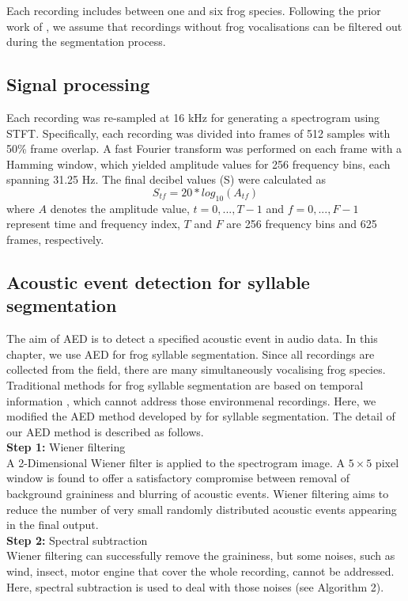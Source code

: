 Each recording includes between one and six frog species. Following the prior work of \citep{briggs2012acoustic}, we assume that recordings without frog vocalisations can be filtered out during the segmentation process.

\subsection{Signal processing}
Each recording was re-sampled at 16 kHz for generating a spectrogram using STFT. Specifically, each recording was divided into frames of 512 samples with 50\% frame overlap.
A fast Fourier transform was performed on each frame with a Hamming window, which yielded amplitude values for 256 frequency bins, each spanning 31.25 Hz. The final decibel values (S) were calculated as 
\begin{equation}
S_{tf} = 20*log_{10}(A_{tf})
\end{equation}
where $A$ denotes the amplitude value, $t=0,...,T-1$ and $f=0,...,F-1$ represent time and frequency index, $T$ and $F$ are 256 frequency bins and 625 frames, respectively. 

\subsection{Acoustic event detection for syllable segmentation}
\label{Ch5:AEDmethod}

The aim of AED is to detect a specified acoustic event in audio data. In this chapter, we use AED for frog syllable segmentation. Since all recordings are collected from the field, there are many simultaneously vocalising frog species. Traditional methods for frog syllable segmentation are based on temporal information \citep{somervuo2004classification,huang2009frog}, which cannot address those environmenal recordings. Here, we modified the AED method developed by  \cite{towsey2012toolbox} for syllable segmentation. The detail of our AED method is described as follows.
\\
\textbf{Step 1:} Wiener filtering 
\noindent
\\
A 2-Dimensional Wiener filter is applied to the spectrogram image. A $5\times5$ pixel window is found to offer a satisfactory compromise between removal of background graininess and blurring of acoustic events. Wiener filtering aims to reduce the number of very small randomly distributed acoustic events appearing in the final output.
\\
\textbf{Step 2:} Spectral subtraction
\noindent 
\\
Wiener filtering can successfully remove the graininess, but some noises, such as wind, insect, motor engine that cover the whole recording, cannot be addressed. Here, spectral subtraction is used to deal with those noises (see Algorithm 2). 


